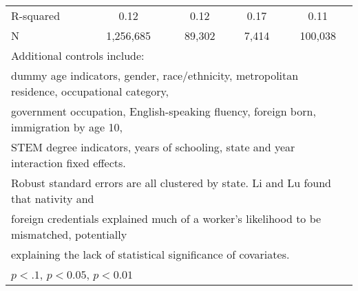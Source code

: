 \begin{table}[htbp]
\begin{tabular}{l*{4}{c}}
R-squared           &        0.12         &        0.12         &        0.17         &        0.11         \\
N                   &   1,256,685         &      89,302         &       7,414         &     100,038         \\
\bottomrule
\multicolumn{5}{l}{\footnotesize Additional controls include:}\\
\multicolumn{5}{l}{\footnotesize dummy age indicators, gender, race/ethnicity, metropolitan residence, occupational category,}\\
\multicolumn{5}{l}{\footnotesize government occupation, English-speaking fluency, foreign born, immigration by age 10,}\\
\multicolumn{5}{l}{\footnotesize STEM degree indicators, years of schooling, state and year interaction fixed effects.}\\
\multicolumn{5}{l}{\footnotesize Robust standard errors are all clustered by state. Li and Lu found that nativity and}\\
\multicolumn{5}{l}{\footnotesize foreign credentials explained much of a worker's likelihood to be mismatched, potentially}\\
\multicolumn{5}{l}{\footnotesize explaining the lack of statistical significance of covariates.}\\
\multicolumn{5}{l}{\footnotesize \sym{*} \(p<.1\), \sym{**} \(p<0.05\), \sym{***} \(p<0.01\)}\\
\end{tabular}
\end{table}
